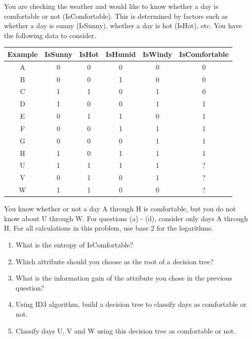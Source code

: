\documentclass[11pt]{article}
\begin{document}

\vspace{-0.5in}

 

You are checking the weather and would like to know whether a day is comfortable or not (IsComfortable). This is determined by factors such as whether a day is sunny (IsSunny), whether a day is hot (IsHot), etc. You have the following data to consider.

\begin{table}[H]
\centering
\begin{tabular}{|c|cccc|c|}
\hline
Example & IsSunny & IsHot & IsHumid & IsWindy & IsComfortable \\ \hline \hline
A & 0 & 0 & 0 & 0 & 0 \\
B & 0 & 0 & 1 & 0 & 0 \\
C & 1 & 1 & 0 & 1 & 0 \\
D & 1 & 0 & 0 & 1 & 1 \\
E & 0 & 1 & 1 & 0 & 1 \\
F & 0 & 0 & 1 & 1 & 1 \\
G & 0 & 0 & 0 & 1 & 1 \\
H & 1 & 0 & 1 & 1 & 1 \\ \hline
U & 1 & 1 & 1 & 1 & ? \\
V & 0 & 1 & 0 & 1 & ? \\
W & 1 & 1 & 0 & 0 & ? \\ \hline
\end{tabular}
\end{table}

You know whether or not a day A through H is comfortable, but you do not know about U through W. For questions (a) - (d), consider only days A through H. For all calculations in this problem, use base 2 for the logarithms.

\begin{enumerate}
\item {} What is the entropy of IsComfortable? \vspace{2cm}

\item {} Which attribute should you choose as the root of a decision tree? \vspace{3cm}

\item {}  What is the information gain of the attribute you chose in the previous question? \vspace{6cm}
 
\item {}  Using ID3 algorithm, build a decision tree to classify days as comfortable or not. \vspace{8cm}

\item {} Classify days U, V and W using this decision tree as comfortable or not. 

\end{enumerate}
\end{document}
